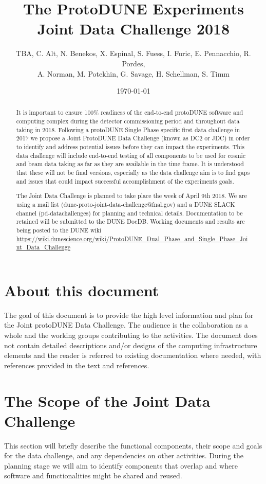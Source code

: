 \documentclass[pdftex,12pt,letter]{article}
\title{The ProtoDUNE Experiments \\
Joint Data Challenge 2018}
\date{\today}
\author{TBA, C. Alt, N. Benekos, X. Espinal, S. Fuess, I. Furic, E. Pennacchio, R. Pordes,   \\
A. Norman, M. Potekhin, G. Savage, H. Schellman, S. Timm}
\newcommand{\pd}{protoDUNE\xspace}
\newcommand{\singp}{Single Phase\xspace}
\begin{document}
\maketitle

\begin{abstract}

\noindent It is important to ensure 100\% readiness of the
end-to-end \pd software and computing complex during the detector commissioning period and
throughout data taking in 2018.  Following a \pd \singp  specific first data challenge in 2017 we propose a Joint ProtoDUNE  Data Challenge (known as DC2 or JDC) in order to identify
and address potential issues before they can impact the experiments.
This data challenge will include end-to-end testing of all components to be used for cosmic and beam data taking as far as they are available in the time frame. It is understood that these will not be final versions, especially as the data challenge aim is to find gaps and issues that could impact successful accomplishment of the experiments goals. 

The Joint Data Challenge is planned to take place the week of April 9th 2018.  We are using a mail list (dune-proto-joint-data-challenge@fnal.gov) and a DUNE SLACK channel (pd-datachallenges) for planning and technical details.  Documentation to be retained will be submitted to the DUNE DocDB. 
Working documents and results are being posted to the DUNE wiki
\url{https://wiki.dunescience.org/wiki/ProtoDUNE_Dual_Phase_and_Single_Phase_Joint_Data_Challenge}
\end{abstract}

\tableofcontents

\pagebreak

\section{About this document}

The goal of this document is to provide the high level information and plan for  the Joint  \pd Data Challenge. The audience is the collaboration as a whole and  the  working groups contributing to the activities.
The document does not contain detailed descriptions
and/or designs of the computing
infrastructure elements and the reader is referred to existing documentation where
needed, with references provided in the text and references. 

\section{The Scope of the Joint Data Challenge}
This section will briefly describe the functional components, their scope and goals for the data challenge,  and any dependencies on other activities. During the planning stage we will aim to identify components that overlap and where software and functionalities might be shared and reused. 
\end{document}
